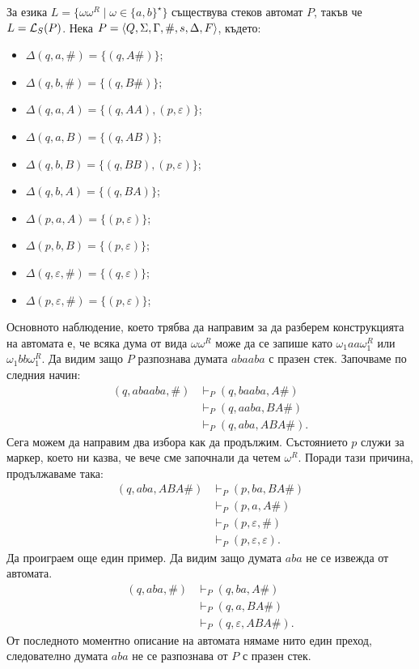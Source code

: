 \begin{example}
  За езика $L = \{\omega\omega^R \mid \omega \in \{a,b\}^\star\}$ съществува стеков автомат $P$, такъв че
  $L = \mathcal{L}_S(P)$.
  Нека $P = \langle{Q,\Sigma,\Gamma,\#,s,\Delta,F}\rangle$, където:
  \begin{itemize}
  \item 
    $\Delta(q, a, \#) = \{(q, A\#)\}$;
  \item 
    $\Delta(q, b, \#) = \{(q, B\#)\}$;
  \item
    $\Delta(q, a, A) = \{(q, AA), (p, \varepsilon)\}$;
  \item
    $\Delta(q, a, B) = \{(q, AB)\}$;
  \item
    $\Delta(q, b, B) = \{(q, BB), (p, \varepsilon)\}$;
  \item
    $\Delta(q, b, A) = \{(q, BA)\}$;
  \item
    $\Delta(p, a, A) = \{(p,\varepsilon)\}$;
  \item
    $\Delta(p, b, B) = \{(p,\varepsilon)\}$;
  \item
    $\Delta(q, \varepsilon, \#) = \{(q,\varepsilon)\}$;
  \item
    $\Delta(p, \varepsilon, \#) = \{(p,\varepsilon)\}$;
  \end{itemize}
  Основното наблюдение, което трябва да направим за да разберем конструкцията на автомата е, че
  всяка дума от вида $\omega\omega^R$ може да се запише като $\omega_1aa\omega^R_1$ или $\omega_1bb\omega^R_1$.
  Да видим защо $P$ разпознава думата $abaaba$ с празен стек.
  Започваме по следния начин:
  \begin{align*}
    (q,abaaba,\#) & \vdash_P (q,baaba,A\#)\\
    & \vdash_P (q, aaba, BA\#) \\
    & \vdash_P (q, aba, ABA\#).
  \end{align*}
  Сега можем да направим два избора как да продължим. Състоянието $p$ служи за маркер, което ни казва, че вече сме започнали 
  да четем $\omega^R$. Поради тази причина, продължаваме така:
  \begin{align*}
    (q, aba, ABA\#) & \vdash_P (p, ba, BA\#)\\
    & \vdash_P (p, a, A\#)\\
    & \vdash_P (p, \varepsilon, \#) \\
    & \vdash_P (p,\varepsilon,\varepsilon).
  \end{align*}
  Да проиграем още един пример. Да видим защо думата $aba$ не се извежда от автомата.
  \begin{align*}
    (q,aba,\#) & \vdash_P (q, ba,A\#)\\
    & \vdash_P (q, a, BA\#)\\
    & \vdash_P (q, \varepsilon, ABA\#).
  \end{align*}
  От последното моментно описание на автомата нямаме нито един преход, следователно
  думата $aba$ не се разпознава от $P$ с празен стек.
\end{example}


